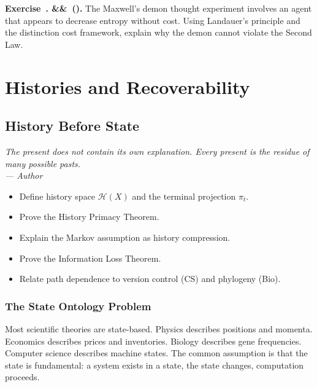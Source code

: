 \documentclass[12pt,twoside,openright]{book}
\newcommand{\hist}{\mathcal{H}}
\newenvironment{epigraph}[2]{%
  \vspace{1em}\begin{flushright}
  \begin{minipage}{0.72\textwidth}
  \itshape\small #1\\[0.4em]
  \upshape\footnotesize\sffamily\color{DistGray}--- #2
  \end{minipage}\end{flushright}\vspace{1.5em}}{}
\newenvironment{objectives}{%
  \begin{tcolorbox}[colback=DistBlue!5,colframe=DistBlue,
    title={\faCheckCircle\enspace Learning Objectives},
    fonttitle=\sffamily\bfseries\color{white},
    attach boxed title to top left={yshift=-2mm,xshift=4mm},
    boxed title style={colback=DistBlue},breakable]
  \begin{itemize}[leftmargin=*,nosep]}{%
  \end{itemize}\end{tcolorbox}\vspace{1em}}
\newcounter{exercise}[chapter]
\newenvironment{exercise}[1][]{%
  \refstepcounter{exercise}%
  \noindent\textbf{\sffamily\color{DistBlue}%
  Exercise~\thechapter.\theexercise%
  \ifx&#1&\else~(#1)\fi.}\enspace}{\par\medskip}
\begin{document}
\begin{exercise}
  The Maxwell's demon thought experiment involves an
  agent that appears to decrease entropy without cost.
  Using Landauer's principle \parencite{landauer1961irreversibility}
  and the distinction cost framework, explain why the
  demon cannot violate the Second Law.
\end{exercise}


\part{Histories and Recoverability}

\chapter{History Before State}
\label{ch:history}

\begin{epigraph}{The present does not contain its own
  explanation. Every present is the residue of many
  possible pasts.}{Author}
\end{epigraph}

\begin{objectives}
  \item Define history space $\hist(X)$ and the terminal
        projection $\pi_t$.
  \item Prove the History Primacy Theorem.
  \item Explain the Markov assumption as history
        compression.
  \item Prove the Information Loss Theorem.
  \item Relate path dependence to version control (CS)
        and phylogeny (Bio).
\end{objectives}

\section{The State Ontology Problem}
\label{sec:ch4-state}

Most scientific theories are state-based. Physics describes
positions and momenta. Economics describes prices and
inventories. Biology describes gene frequencies. Computer
science describes machine states. The common assumption is
that the state is fundamental: a system exists in a state,
the state changes, computation proceeds.
\end{document}
